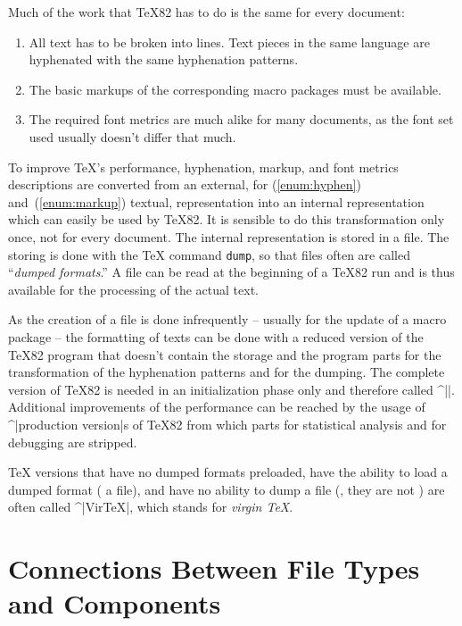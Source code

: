 Much of the work that \TeX82 has to do is the same for every
document:
%
 \begin{enumerate}

\item \label{enum:hyphen}
 All text has to be broken into lines. Text pieces in the same
language are hyphenated with the same hyphenation patterns.

\item \label{enum:markup}
 The basic markups of the corresponding macro packages must be
available.

\item The required font metrics are much alike for many documents, as the
font set used usually doesn't differ that much.

\end{enumerate} 
% 
 To improve \TeX{}'s performance, hyphenation, markup, and font
metrics descriptions are converted from an external, for
(\ref{enum:hyphen}) and~(\ref{enum:markup}) textual, representation
into an internal representation which can easily be used by \TeX82.
It is sensible to do this transformation only once, not for every
document. The internal representation is stored in a  file.
The storing is done with the \TeX{} command {\tt \bs{}dump}, so that
\FMT{} files often are called ``{\it dumped formats}.'' A \FMT{} file
can be read at the beginning of a \TeX82 run and is thus available
for the processing of the actual text.

As the creation of a \FMT{} file is done infrequently -- usually for
the update of a macro package -- the formatting of texts can be done
with a reduced version of the \TeX82 program that doesn't contain the
storage and the program parts for the transformation of the
hyphenation patterns and for the dumping. The complete version of
\TeX82 is needed in an initialization phase only and therefore called
^|\INITeX{}|. Additional improvements of the performance can be
reached  by the usage of ^|production version|s of \TeX82 from which
parts for statistical analysis and for debugging are stripped. 

\TeX{} versions that have no dumped formats preloaded, have the
ability to load a dumped format (\ie{} a \FMT{} file), and have no
ability to dump a \FMT{} file (\ie{}, they are not \INITeX{}) are
often called ^|Vir\TeX{}|, which stands for {\it virgin \TeX{}}.



\section{Connections Between File Types and Components}

